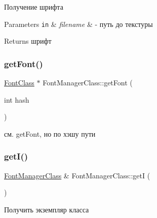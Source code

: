 Получение шрифта 


\begin{DoxyParams}[1]{Parameters}
\mbox{\tt in}  & {\em filename} & -\/ путь до текстуры \\
\hline
\end{DoxyParams}
\begin{DoxyReturn}{Returns}
шрифт 
\end{DoxyReturn}
\mbox{\label{class_font_manager_class_a30b1b840630e586c9105881d897da75a}} 
\subsubsection{\texorpdfstring{get\+Font()}{getFont()}\hspace{0.1cm}{\footnotesize\ttfamily [2/2]}}
{\footnotesize\ttfamily \hyperlink{class_font_class}{Font\+Class} $\ast$ Font\+Manager\+Class\+::get\+Font (\begin{DoxyParamCaption}\item[{int}]{hash }\end{DoxyParamCaption})}



см. get\+Font, но по хэшу пути 

\mbox{\label{class_font_manager_class_a666349d4b50faaa5afcd736e969d8f48}} 
\subsubsection{\texorpdfstring{get\+I()}{getI()}}
{\footnotesize\ttfamily \hyperlink{class_font_manager_class}{Font\+Manager\+Class} \& Font\+Manager\+Class\+::getI (\begin{DoxyParamCaption}{ }\end{DoxyParamCaption})\hspace{0.3cm}{\ttfamily [static]}}



Получить экземпляр класса 

\mbox{\label{class_font_manager_class_acab5a632a5ef3870ee09626fd71c69ef}} 
